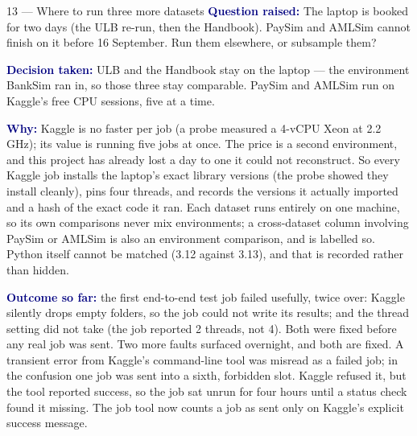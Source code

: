 \documentclass[11pt]{article}
\newcommand{\qlabel}[1]{\textbf{\textcolor{navy}{#1}}\;}
\begin{document}
\begin{decision}{13 --- Where to run three more datasets}
\qlabel{Question raised:} The laptop is booked for two days (the ULB re-run, then the Handbook). PaySim
and AMLSim cannot finish on it before 16 September. Run them elsewhere, or subsample them?

\qlabel{Decision taken:} ULB and the Handbook stay on the laptop --- the environment BankSim ran in, so
those three stay comparable. PaySim and AMLSim run on Kaggle's free CPU sessions, five at a time.

\qlabel{Why:} Kaggle is no faster per job (a probe measured a 4-vCPU Xeon at 2.2\,GHz); its value is
running five jobs at once. The price is a second environment, and this project has already lost a day
to one it could not reconstruct. So every Kaggle job installs the laptop's exact library versions (the
probe showed they install cleanly), pins four threads, and records the versions it actually imported and
a hash of the exact code it ran. Each dataset runs entirely on one machine, so its own comparisons never
mix environments; a cross-dataset column involving PaySim or AMLSim is also an environment comparison,
and is labelled so. Python itself cannot be matched (3.12 against 3.13), and that is recorded rather
than hidden.

\qlabel{Outcome so far:} the first end-to-end test job failed usefully, twice over: Kaggle silently drops
empty folders, so the job could not write its results; and the thread setting did not take (the job
reported 2 threads, not 4). Both were fixed before any real job was sent. Two more faults surfaced
overnight, and both are fixed. A transient error from Kaggle's command-line tool was misread as a failed
job; in the confusion one job was sent into a sixth, forbidden slot. Kaggle refused it, but the tool
reported success, so the job sat unrun for four hours until a status check found it missing. The job tool
now counts a job as sent only on Kaggle's explicit success message.
\end{decision}
\end{document}
